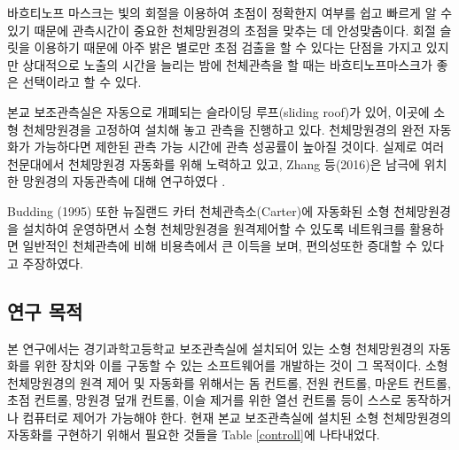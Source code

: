바흐티노프 마스크는 빛의 회절을 이용하여 초점이 정확한지 여부를  쉽고 빠르게 알 수 있기 때문에 관측시간이 중요한 천체망원경의 초점을 맞추는 데 안성맞춤이다. 회절 슬릿을 이용하기 때문에 아주 밝은 별로만 초점 검출을 할 수 있다는 단점을 가지고 있지만 상대적으로 노출의 시간을 늘리는 밤에 천체관측을 할 때는 바흐티노프마스크가 좋은 선택이라고 할 수 있다.

본교 보조관측실은 자동으로 개폐되는 슬라이딩 루프(sliding roof)가 있어, 이곳에 소형 천체망원경을 고정하여 설치해 놓고 관측을 진행하고 있다. 천체망원경의 완전 자동화가 가능하다면 제한된 관측 가능 시간에 관측 성공률이 높아질 것이다. 실제로 여러 천문대에서 천체망원경 자동화를 위해 노력하고 있고, Zhang 등(2016)은 남극에 위치한 망원경의 자동관측에 대해 연구하였다 \cite{Zhang2016}.

Budding (1995) 또한 뉴질랜드 카터 천체관측소(Carter)에 자동화된 소형 천체망원경을 설치하여 운영하면서 소형 천체망원경을 원격제어할 수 있도록 네트워크를 활용하면 일반적인 천체관측에 비해 비용측에서 큰 이득을 보며, 편의성또한 증대할 수 있다고 주장하였다.\cite{budding1995global} 



\subsection{연구 목적}


본 연구에서는 경기과학고등학교 보조관측실에 설치되어 있는 소형 천체망원경의 자동화를 위한 장치와 이를 구동할 수 있는 소프트웨어를 개발하는 것이 그 목적이다. 소형 천체망원경의 원격 제어 및 자동화를 위해서는 돔 컨트롤, 전원 컨트롤, 마운트 컨트롤, 초점 컨트롤, 망원경 덮개 컨트롤, 이슬 제거를 위한 열선 컨트롤 등이 스스로 동작하거나 컴퓨터로 제어가 가능해야 한다. 현재 본교 보조관측실에 설치된 소형 천체망원경의 자동화를 구현하기 위해서 필요한 것들을 \textrm{Table} \ref{controll}에 나타내었다.

